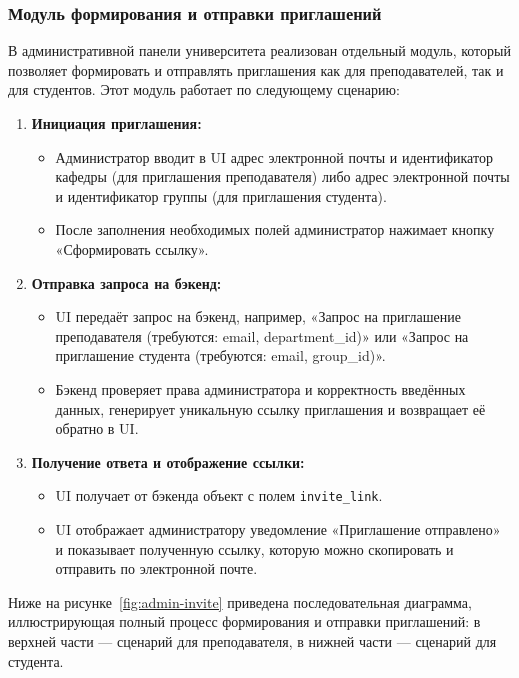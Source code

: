 \subsubsection{Модуль формирования и отправки приглашений}
В административной панели университета реализован отдельный модуль, который позволяет формировать и отправлять приглашения как для преподавателей, так и для студентов. Этот модуль работает по следующему сценарию:

\begin{enumerate}
    \item \textbf{Инициация приглашения:} 
    \begin{itemize}
        \item Администратор вводит в UI адрес электронной почты и идентификатор кафедры (для приглашения преподавателя) либо адрес электронной почты и идентификатор группы (для приглашения студента).
        \item После заполнения необходимых полей администратор нажимает кнопку «Сформировать ссылку».
    \end{itemize}
    \item \textbf{Отправка запроса на бэкенд:} 
    \begin{itemize}
        \item UI передаёт запрос на бэкенд, например, «Запрос на приглашение преподавателя (требуются: email, department\_id)» или «Запрос на приглашение студента (требуются: email, group\_id)».
        \item Бэкенд проверяет права администратора и корректность введённых данных, генерирует уникальную ссылку приглашения и возвращает её обратно в UI.
    \end{itemize}
    \item \textbf{Получение ответа и отображение ссылки:} 
    \begin{itemize}
        \item UI получает от бэкенда объект с полем \texttt{invite\_link}.
        \item UI отображает администратору уведомление «Приглашение отправлено» и показывает полученную ссылку, которую можно скопировать и отправить по электронной почте.
    \end{itemize}
\end{enumerate}

Ниже на рисунке~\ref{fig:admin-invite} приведена последовательная диаграмма, иллюстрирующая полный процесс формирования и отправки приглашений: в верхней части — сценарий для преподавателя, в нижней части — сценарий для студента.

